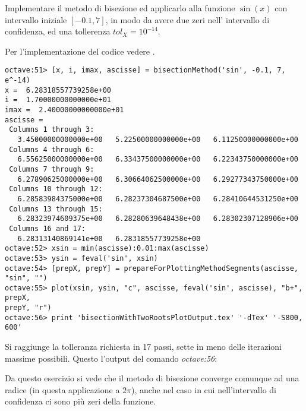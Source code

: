 \begin{exercise}
Implementare il metodo di bisezione ed applicarlo alla funzione $\sin(x)$ 
con intervallo iniziale $[-0.1, 7]$, in modo da avere due zeri nell'
intervallo di confidenza, ed una tollerenza $tol_{X} = 10^{-14}$.
\end{exercise}
Per l'implementazione del codice vedere .
\begin{lstlisting}
octave:51> [x, i, imax, ascisse] = bisectionMethod('sin', -0.1, 7, e^-14)
x =  6.28318557739258e+00
i =  1.70000000000000e+01
imax =  2.40000000000000e+01
ascisse =
 Columns 1 through 3:
   3.45000000000000e+00   5.22500000000000e+00   6.11250000000000e+00
 Columns 4 through 6:
   6.55625000000000e+00   6.33437500000000e+00   6.22343750000000e+00
 Columns 7 through 9:
   6.27890625000000e+00   6.30664062500000e+00   6.29277343750000e+00
 Columns 10 through 12:
   6.28583984375000e+00   6.28237304687500e+00   6.28410644531250e+00
 Columns 13 through 15:
   6.28323974609375e+00   6.28280639648438e+00   6.28302307128906e+00
 Columns 16 and 17:
   6.28313140869141e+00   6.28318557739258e+00
octave:52> xsin = min(ascisse):0.01:max(ascisse)
octave:53> ysin = feval('sin', xsin)
octave:54> [prepX, prepY] = prepareForPlottingMethodSegments(ascisse, "sin", "")
octave:55> plot(xsin, ysin, "c", ascisse, feval('sin', ascisse), "b+", prepX,
prepY, "r") 
octave:56> print 'bisectionWithTwoRootsPlotOutput.tex' '-dTex' '-S800, 600'
\end{lstlisting}
Si raggiunge la tolleranza richiesta in 17 passi, sette in meno delle iterazioni massime possibili. 
Questo l'output del comando \emph{octave:56}:
\begin{center}

\end{center}

Da questo esercizio si vede che il metodo di bisezione converge comunque
ad una radice (in questa applicazione a $2\pi$), anche nel caso in cui
nell'intervallo di confidenza ci sono pi\`u zeri della funzione.




